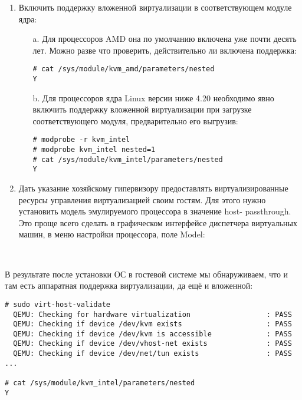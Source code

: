 \documentclass[14pt, a4paper]{article}
\begin{document}
\begin{enumerate}
    \item Включить поддержку вложенной виртуализации в соответствующем модуле ядра:
    \begin{enumerate}
        \item[a.] Для процессоров AMD она по умолчанию включена уже почти десять лет. Можно разве
        что проверить, действительно ли включена поддержка:
        \vspace{0.3cm}
\begin{lstlisting}
# cat /sys/module/kvm_amd/parameters/nested
Y
\end{lstlisting}
        \item[b.] Для процессоров ядра Linux версии ниже 4.20 необходимо явно включить поддержку
        вложенной виртуализации при загрузке соответствующего модуля, предварительно его
        выгрузив:
        \vspace{0.3cm}
\begin{lstlisting}
# modprobe -r kvm_intel
# modprobe kvm_intel nested=1
# cat /sys/module/kvm_intel/parameters/nested
Y
\end{lstlisting}   
    \end{enumerate}

    \item Дать указание хозяйскому гипервизору предоставлять виртуализированные ресурсы
    управления виртуализацией своим гостям. Для этого нужно установить модель эмулируемого
    процессора в значение
    \colorbox{backcolour}{host-} \colorbox{backcolour}{passthrough}.\\
    Это проще всего сделать в графическом интерфейсе диспетчера виртуальных машин, в меню
    настройки процессора, поле Model:
\end{enumerate}
\newpage
\begin{figure}[h]
    \begin{centering}
      \mbox{}\\
    \label{framework} 
    \end{centering}
\end{figure}
    
    В результате после установки ОС в гостевой системе мы обнаруживаем, что и там есть аппаратная
поддержка виртуализации, да ещё и вложенной:
\vspace{0.3cm}
\begin{lstlisting}
# sudo virt-host-validate
  QEMU: Checking for hardware virtualization                  : PASS
  QEMU: Checking if device /dev/kvm exists                    : PASS
  QEMU: Checking if device /dev/kvm is accessible             : PASS
  QEMU: Checking if device /dev/vhost-net exists              : PASS
  QEMU: Checking if device /dev/net/tun exists                : PASS
...

# cat /sys/module/kvm_intel/parameters/nested
Y
\end{lstlisting}
\end{document}
